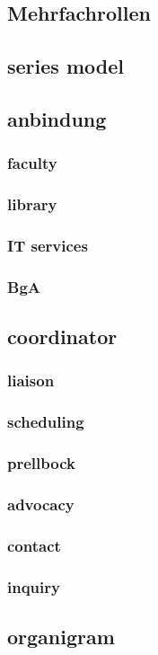 \documentclass[guidelines,nonflat,modfonts] {langsci/langscibook}
\begin{document}
\subsection{Mehrfachrollen}
\subsection{series model}
\subsection{anbindung}
\subsubsection{faculty}
\subsubsection{library}
\subsubsection{IT services}
\subsubsection{BgA}
\subsection{coordinator}
\subsubsection{liaison}
\subsubsection{scheduling}
\subsubsection{prellbock}
\subsubsection{advocacy}
\subsubsection{contact}
\subsubsection{inquiry}
\subsection{organigram}
\end{document}

